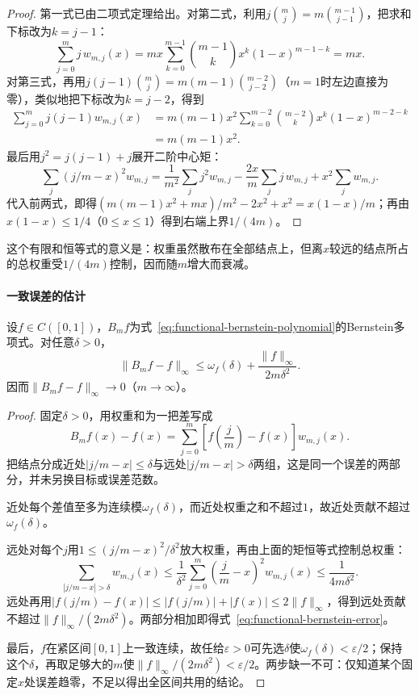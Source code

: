 \begin{proof}
第一式已由二项式定理给出。对第二式，利用$j\binom mj=m\binom{m-1}{j-1}$，把求和下标改为$k=j-1$：
\[
  \sum_{j=0}^m j\,w_{m,j}(x)
  =mx\sum_{k=0}^{m-1}\binom{m-1}{k}x^k(1-x)^{m-1-k}
  =mx.
\]
对第三式，再用$j(j-1)\binom mj=m(m-1)\binom{m-2}{j-2}$（$m=1$时左边直接为零），类似地把下标改为$k=j-2$，得到
\[
  \begin{aligned}
  \sum_{j=0}^m j(j-1)w_{m,j}(x)
  &=m(m-1)x^2
    \sum_{k=0}^{m-2}\binom{m-2}{k}x^k(1-x)^{m-2-k}\\
  &=m(m-1)x^2.
  \end{aligned}
\]
最后用$j^2=j(j-1)+j$展开二阶中心矩：
\[
  \sum_j(j/m-x)^2w_{m,j}
  =\frac1{m^2}\sum_jj^2w_{m,j}-\frac{2x}{m}\sum_jj\,w_{m,j}+x^2\sum_jw_{m,j}.
\]
代入前两式，即得$(m(m-1)x^2+mx)/m^2-2x^2+x^2=x(1-x)/m$；再由$x(1-x)\le1/4$（$0\le x\le1$）得到右端上界$1/(4m)$。
\end{proof}

这个有限和恒等式的意义是：权重虽然散布在全部结点上，但离$x$较远的结点所占的总权重受$1/(4m)$控制，因而随$m$增大而衰减。

\paragraph{一致误差的估计}

\begin{theorem}
设$f\in C([0,1])$，$B_mf$为式~\eqref{eq:functional-bernstein-polynomial}的Bernstein多项式。对任意$\delta>0$，
\begin{equation}
  \|B_mf-f\|_\infty
  \le\omega_f(\delta)+\frac{\|f\|_\infty}{2m\delta^2}.
  \label{eq:functional-bernstein-error}
\end{equation}
因而$\|B_mf-f\|_\infty\to0$（$m\to\infty$）。
\end{theorem}

\begin{proof}
固定$\delta>0$，用权重和为一把差写成
\[
  B_mf(x)-f(x)
  =\sum_{j=0}^m\left[f\!\left(\frac jm\right)-f(x)\right]w_{m,j}(x).
\]
把结点分成近处$|j/m-x|\le\delta$与远处$|j/m-x|>\delta$两组，这是同一个误差的两部分，并未另换目标或误差范数。

近处每个差值至多为连续模$\omega_f(\delta)$，而近处权重之和不超过$1$，故近处贡献不超过$\omega_f(\delta)$。

远处对每个$j$用$1\le(j/m-x)^2/\delta^2$放大权重，再由上面的矩恒等式控制总权重：
\[
  \sum_{|j/m-x|>\delta}w_{m,j}(x)
  \le\frac1{\delta^2}\sum_{j=0}^m\left(\frac jm-x\right)^2w_{m,j}(x)
  \le\frac1{4m\delta^2}.
\]
远处再用$|f(j/m)-f(x)|\le|f(j/m)|+|f(x)|\le2\|f\|_\infty$，得到远处贡献不超过$\|f\|_\infty/(2m\delta^2)$。两部分相加即得式~\eqref{eq:functional-bernstein-error}。

最后，$f$在紧区间$[0,1]$上一致连续，故任给$\varepsilon>0$可先选$\delta$使$\omega_f(\delta)<\varepsilon/2$；保持这个$\delta$，再取足够大的$m$使$\|f\|_\infty/(2m\delta^2)<\varepsilon/2$。两步缺一不可：仅知道某个固定$x$处误差趋零，不足以得出全区间共用的结论。
\end{proof}

